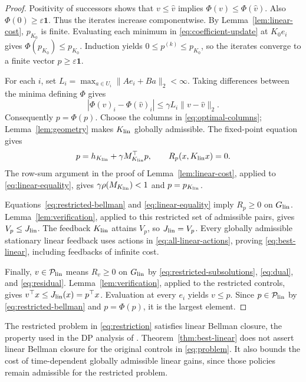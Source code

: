 \documentclass[10pt]{article}
\newcommand{\one}{\mathbf 1}
\begin{document}
\begin{proof}
Positivity of successors shows that $v\le\widehat v$ implies $\Phi(v)\le\Phi(\widehat v)$. Also $\Phi(0)\ge\varepsilon\one$. Thus the iterates increase componentwise. By Lemma~\ref{lem:linear-cost}, $p_{K_0}$ is finite. Evaluating each minimum in \eqref{eq:coefficient-update} at $K_0e_i$ gives $\Phi(p_{K_0})\le p_{K_0}$. Induction yields $0\le p^{(k)}\le p_{K_0}$, so the iterates converge to a finite vector $p\ge\varepsilon\one$.

For each $i$, set $L_i=\max_{a\in U_i}\|Ae_i+Ba\|_2<\infty$. Taking differences between the minima defining $\Phi$ gives
\[
 |\Phi(v)_i-\Phi(\widehat v)_i|
 \le\gamma L_i\|v-\widehat v\|_2.
\]
Consequently $p=\Phi(p)$. Choose the columns in \eqref{eq:optimal-columns}; Lemma~\ref{lem:geometry} makes $K_{\rm lin}$ globally admissible. The fixed-point equation gives
\begin{equation}
 p=h_{K_{\rm lin}}+\gamma M_{K_{\rm lin}}^\top p,
 \qquad R_p(x,K_{\rm lin}x)=0.
 \label{eq:linear-equality}
\end{equation}
The row-sum argument in the proof of Lemma~\ref{lem:linear-cost}, applied to \eqref{eq:linear-equality}, gives $\gamma\rho(M_{K_{\rm lin}})<1$ and $p=p_{K_{\rm lin}}$.

Equations~\eqref{eq:restricted-bellman} and \eqref{eq:linear-equality} imply $R_p\ge0$ on $G_{\rm lin}$. Lemma~\ref{lem:verification}, applied to this restricted set of admissible pairs, gives $V_p\le J_{\rm lin}$. The feedback $K_{\rm lin}$ attains $V_p$, so $J_{\rm lin}=V_p$. Every globally admissible stationary linear feedback uses actions in \eqref{eq:all-linear-actions}, proving \eqref{eq:best-linear}, including feedbacks of infinite cost.

Finally, $v\in\mathcal P_{\rm lin}$ means $R_v\ge0$ on $G_{\rm lin}$ by \eqref{eq:restricted-subsolutions}, \eqref{eq:dual}, and \eqref{eq:residual}. Lemma~\ref{lem:verification}, applied to the restricted controls, gives $v^\top x\le J_{\rm lin}(x)=p^\top x$. Evaluation at every $e_i$ yields $v\le p$. Since $p\in\mathcal P_{\rm lin}$ by \eqref{eq:restricted-bellman} and $p=\Phi(p)$, it is the largest element.
\end{proof}

The restricted problem in \eqref{eq:restriction} satisfies linear Bellman closure, the property used in the DP analysis of \cite{li-bertsekas}. Theorem~\ref{thm:best-linear} does not assert linear Bellman closure for the original controls in \eqref{eq:problem}. It also bounds the cost of time-dependent globally admissible linear gains, since those policies remain admissible for the restricted problem.
\end{document}

